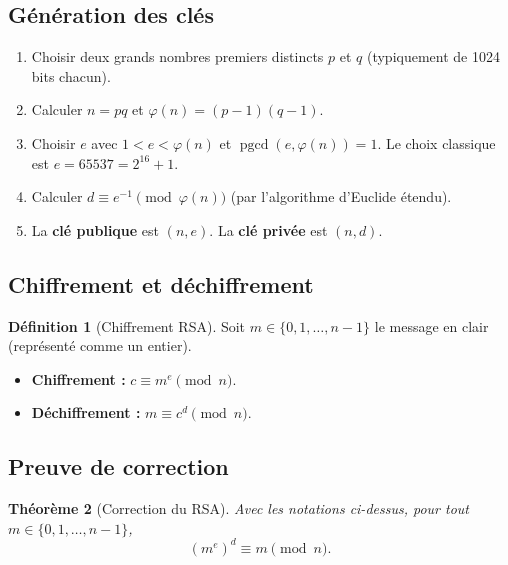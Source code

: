 \documentclass[12pt,a4paper,openany]{book}
\theoremstyle{definition}
\newtheorem{definition}{Définition}[chapter]
\theoremstyle{plain}
\newtheorem{theoreme}[definition]{Théorème}
\theoremstyle{remark}
\DeclareMathOperator{\pgcd}{pgcd}
\begin{document}
\subsection{Génération des clés}
\label{subsec:RSA-cles}

\begin{enumerate}
  \item Choisir deux grands nombres premiers distincts $p$ et $q$ (typiquement
    de 1024 bits chacun).
  \item Calculer $n = pq$ et $\varphi(n) = (p-1)(q-1)$.
  \item Choisir $e$ avec $1 < e < \varphi(n)$ et $\pgcd(e, \varphi(n)) = 1$.
    Le choix classique est $e = 65537 = 2^{16} + 1$.
  \item Calculer $d \equiv e^{-1} \pmod{\varphi(n)}$ (par l'algorithme d'Euclide
    étendu).
  \item La \textbf{clé publique} est $(n, e)$.
    La \textbf{clé privée} est $(n, d)$.
\end{enumerate}

\subsection{Chiffrement et déchiffrement}
\label{subsec:RSA-chiffrement}

\begin{definition}[Chiffrement RSA]
\label{def:RSA-operations}
Soit $m \in \{0, 1, \ldots, n-1\}$ le message en clair (représenté comme un
entier).
\begin{itemize}
  \item \textbf{Chiffrement :} $c \equiv m^e \pmod{n}$.
  \item \textbf{Déchiffrement :} $m \equiv c^d \pmod{n}$.
\end{itemize}
\end{definition}

\subsection{Preuve de correction}
\label{subsec:RSA-preuve}

\begin{theoreme}[Correction du RSA]
\label{thm:RSA-correct}
Avec les notations ci-dessus, pour tout $m \in \{0, 1, \ldots, n-1\}$,
\[
  (m^e)^d \equiv m \pmod{n}.
\]
\end{theoreme}
\end{document}

